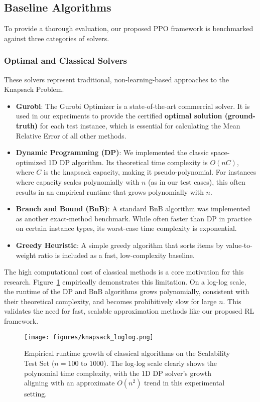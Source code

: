 \subsection{Baseline Algorithms}
To provide a thorough evaluation, our proposed PPO framework is benchmarked against three categories of solvers.

\subsubsection{Optimal and Classical Solvers}
These solvers represent traditional, non-learning-based approaches to the Knapsack Problem.
\begin{itemize}
    \item \textbf{Gurobi}: The Gurobi Optimizer is a state-of-the-art commercial solver. It is used in our experiments to provide the certified \textbf{optimal solution (ground-truth)} for each test instance, which is essential for calculating the Mean Relative Error of all other methods.
    \item \textbf{Dynamic Programming (DP)}: We implemented the classic space-optimized 1D DP algorithm. Its theoretical time complexity is $O(nC)$, where $C$ is the knapsack capacity, making it pseudo-polynomial. For instances where capacity scales polynomially with $n$ (as in our test cases), this often results in an empirical runtime that grows polynomially with $n$.
    \item \textbf{Branch and Bound (BnB)}: A standard BnB algorithm was implemented as another exact-method benchmark. While often faster than DP in practice on certain instance types, its worst-case time complexity is exponential.
    \item \textbf{Greedy Heuristic}: A simple greedy algorithm that sorts items by value-to-weight ratio is included as a fast, low-complexity baseline.
\end{itemize}
The high computational cost of classical methods is a core motivation for this research. Figure~\ref{fig:complexity_growth} empirically demonstrates this limitation. On a log-log scale, the runtime of the DP and BnB algorithms grows polynomially, consistent with their theoretical complexity, and becomes prohibitively slow for large $n$. This validates the need for fast, scalable approximation methods like our proposed RL framework.

\begin{figure}[htbp]
    \centering
    \texttt{[image: figures/knapsack\_loglog.png]}
    \caption{Empirical runtime growth of classical algorithms on the Scalability Test Set ($n=100$ to $1000$). The log-log scale clearly shows the polynomial time complexity, with the 1D DP solver's growth aligning with an approximate $O(n^2)$ trend in this experimental setting.}
    \label{fig:complexity_growth}
\end{figure}

